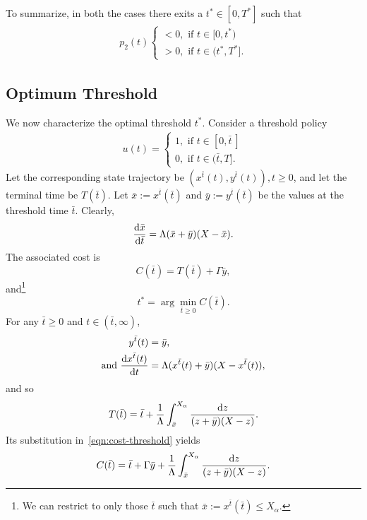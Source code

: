 \documentclass[10pt,journal,letterpaper]{IEEEtran}
\begin{document}
\begin{IEEEproof}
To summarize, in both the cases there exits a $t^{\ast} \in
[0,T^{\ast}]$ such that
\begin{align*}
p_2(t) \left\{ \begin{array}{ll}
                 < 0, \mbox{ if } t \in [0, t^{\ast})\\
                 > 0, \mbox{ if } t \in (t^{\ast},T^{\ast}].\end{array} \right.
\end{align*}

\subsection{Optimum Threshold}
We now characterize the optimal threshold $t^{\ast}$. Consider a threshold policy
\begin{align*}
u(t) = \left\{ \begin{array}{ll}
                 1, \mbox{ if } t \in [0, \bar{t}~]\\
                 0, \mbox{ if } t \in (\bar{t},T].\end{array} \right.
\end{align*}
Let the corresponding state trajectory be
$(x^{\bar{t}}(t),y^{\bar{t}}(t)), t \geq 0$, and let the terminal
time be $T(\bar{t})$. Let $\bar{x} := x^{\bar{t}}(\bar{t})$ and
$\bar{y} := y^{\bar{t}}(\bar{t})$ be the values at the threshold
time $\bar{t}$. Clearly,
\begin{equation}
\frac{{\rm d}\bar{x}}{{\rm d}\bar{t}} = \Lambda(\bar{x} +
\bar{y})(X-\bar{x}). \label{eqn:gredient-barx}
\end{equation}
The associated cost is
\begin{equation}
C(\bar{t}) = T(\bar{t}) + \Gamma \bar{y}, \label{eqn:cost-threshold}
\end{equation}
and\footnote{We can restrict to only those $\bar{t}$ such that $\bar{x} := x^{\bar{t}}(\bar{t}) \leq X_{\alpha}$.}
\[
t^{\ast} = \arg \min_{\bar{t} \geq 0} C(\bar{t}).
\]
For any $\bar{t} \geq 0$ and $t \in (\bar{t}, \infty)$,
\begin{align*}
y^{\bar{t}}(t) &= \bar{y}, \\
\mbox{and } \frac{{\rm d}x^{\bar{t}}(t)}{{\rm d}t} &= \Lambda
(x^{\bar{t}}(t) + \bar{y})(X-x^{\bar{t}}(t)),
\end{align*}
and so
\[
T(\bar{t}) = \bar{t} + \frac{1}{\Lambda}\int_{\bar{x}}^{X_{\alpha}}\frac{{\rm d}z}{(z + \bar{y})(X - z)}.
\]
Its substitution in~\eqref{eqn:cost-threshold} yields
\[
C(\bar{t}) = \bar{t} +  \Gamma \bar{y} + \frac{1}{\Lambda}\int_{\bar{x}}^{X_{\alpha}}\frac{{\rm d}z}{(z + \bar{y})(X - z)}.
\]
\end{IEEEproof}
\end{document}
